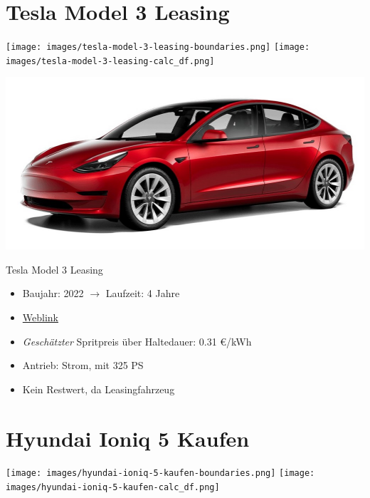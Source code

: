 \documentclass[landscape, DIV=99, 14pt]{scrartcl}
\begin{document}
\pagebreak


\twocolumn

\section*{Tesla Model 3 Leasing}
\begin{center}
\texttt{[image: images/tesla-model-3-leasing-boundaries.png]}
\null
\vspace{0.5cm}
\texttt{[image: images/tesla-model-3-leasing-calc\_df.png]}
\end{center}

\pagebreak
\null
\vspace{2cm}
\begin{center}
\includegraphics[width=0.9\columnwidth]{cars/tesla-model-3-leasing.jpg}

Tesla Model 3 Leasing
\end{center}

\begin{itemize}
    \item Baujahr: 2022 $\rightarrow$ Laufzeit: 4 Jahre
    \item \href{https://www.tesla.com/de_de/model3/design\#overview}{Weblink}
    \item \emph{Gesch\"atzter} Spritpreis \"uber Haltedauer: 0.31 \euro{}/kWh
    \item Antrieb: Strom, mit 325 PS
    \item Kein Restwert, da Leasingfahrzeug
\end{itemize}

\pagebreak


\twocolumn

\section*{Hyundai Ioniq 5 Kaufen}
\begin{center}
\texttt{[image: images/hyundai-ioniq-5-kaufen-boundaries.png]}
\null
\vspace{0.5cm}
\texttt{[image: images/hyundai-ioniq-5-kaufen-calc\_df.png]}
\end{center}
\end{document}
